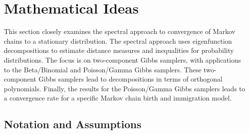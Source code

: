 \documentclass[12pt]{article}
\begin{document}
\section*{Mathematical Ideas}

This section closely examines the spectral approach to convergence of
Markov chains to a stationary distribution.  The spectral approach uses
eigenfunction decompositions to estimate distance measures and
inequalities for probability distributions.  The focus is on
two-component Gibbs samplers, with applications to the Beta/Binomial and
Poisson/Gamma Gibbs samplers.  These two-component Gibbs samplers lead
to decompositions in terms of orthogonal polynomials.  Finally, the
results for the Poisson/Gamma Gibbs samplers leads to a convergence rate
for a specific Markov chain birth and immigration model.

\subsection*{Notation and Assumptions}
\end{document}

